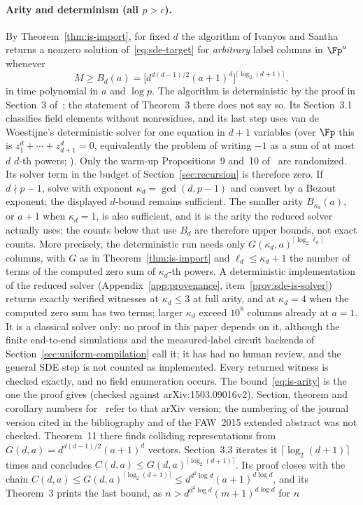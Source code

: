 \paragraph{Arity and determinism (all $p > c$).}
By Theorem~\ref{thm:is-import}, for fixed $d$ the algorithm of Ivanyos and Santha~\cite[Sections~3.1--3.3]{IvanyosSantha2015} returns a nonzero solution of~\eqref{eq:sde-target} for \emph{arbitrary} label columns in $\Fp^{a}$ whenever
\begin{equation}
  \label{eq:is-arity}
  M \ge B_d(a) = \bigl[d^{d(d-1)/2}(a+1)^d\bigr]^{\lceil \log_2(d+1)\rceil},
\end{equation}
in time polynomial in $a$ and $\log p$. The algorithm is deterministic by the proof in Section~3 of~\cite{IvanyosSantha2015}; the statement of Theorem~3 there does not say so. Its Section~3.1 classifies field elements without nonresidues, and its last step uses van de Woestijne's deterministic solver for one equation in $d+1$ variables (over $\Fp$ this is $z_1^d + \cdots + z_{d+1}^d = 0$, equivalently the problem of writing $-1$ as a sum of at most $d$ $d$-th powers; \cite[Section~6]{vandeWoestijne2005}). Only the warm-up Propositions~9 and~10 of~\cite{IvanyosSantha2015} are randomized. Its solver term in the budget of Section~\ref{sec:recursion} is therefore zero. If $d \nmid p-1$, solve with exponent $\kappa_d = \gcd(d,p-1)$ and convert by a Bezout exponent; the displayed $d$-bound remains sufficient. The smaller arity $B_{\kappa_d}(a)$, or $a+1$ when $\kappa_d = 1$, is also sufficient, and it is the arity the reduced solver actually uses; the counts below that use $B_d$ are therefore upper bounds, not exact counts. More precisely, the deterministic run needs only $G(\kappa_d,a)^{\lceil\log_2 \ell_d\rceil}$ columns, with $G$ as in Theorem~\ref{thm:is-import} and $\ell_d \le \kappa_d+1$ the number of terms of the computed zero sum of $\kappa_d$-th powers. A deterministic implementation of the reduced solver (Appendix~\ref{app:provenance}, item~\ref{prov:sde-is-solver}) returns exactly verified witnesses at $\kappa_d \le 3$ at full arity, and at $\kappa_d = 4$ when the computed zero sum has two terms; larger $\kappa_d$ exceed $10^8$ columns already at $a = 1$. It is a classical solver only: no proof in this paper depends on it, although the finite end-to-end simulations and the measured-label circuit backends of Section~\ref{sec:uniform-compilation} call it; it has had no human review, and the general SDE step is not counted as implemented. Every returned witness is checked exactly, and no field enumeration occurs. The bound~\eqref{eq:is-arity} is the one the proof gives (checked against arXiv:1503.09016v2). Section, theorem and corollary numbers for~\cite{IvanyosSantha2015} refer to that arXiv version; the numbering of the journal version cited in the bibliography and of the FAW~2015 extended abstract was not checked. Theorem~11 there finds colliding representations from $G(d,a) = d^{d(d-1)/2}(a+1)^d$ vectors. Section~3.3 iterates it $\lceil\log_2(d+1)\rceil$ times and concludes $C(d,a) \le G(d,a)^{\lceil\log_2(d+1)\rceil}$. Its proof closes with the chain $C(d,a) \le G(d,a)^{\lceil\log_2(d+1)\rceil} \le d^{d^2\log d}(a+1)^{d\log d}$, and its Theorem~3 prints the last bound, as $n > d^{d^2\log d}(m+1)^{d\log d}$ for $n$ 